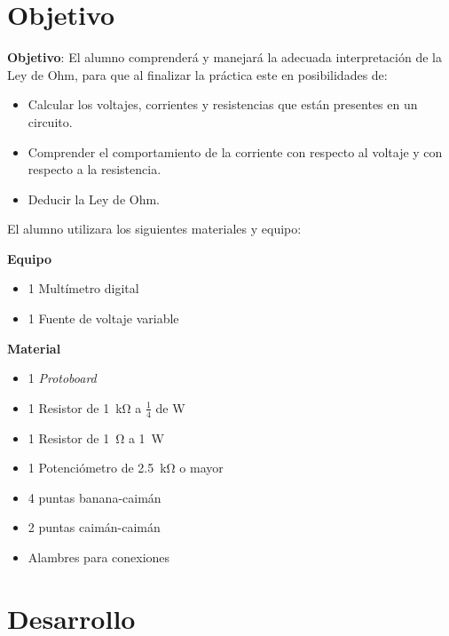 \documentclass[a4paper,12pt]{article}
\begin{document}
\newpage


\section*{Objetivo}

\textbf{Objetivo}: El alumno comprenderá y manejará la adecuada interpretación de la Ley de Ohm, para que al finalizar la práctica este en posibilidades de:\par

\begin{itemize}
	\item Calcular los voltajes, corrientes y resistencias que están presentes en un circuito.
	\item Comprender el comportamiento de la corriente con respecto al voltaje y con respecto a la resistencia.
	\item Deducir la Ley de Ohm.
\end{itemize}


El alumno utilizara los siguientes materiales y equipo:

\begin{multicols}{2}
\textbf{Equipo}\\
\begin{itemize}[nosep]
	\item 1 Multímetro digital
	\item 1 Fuente de voltaje variable
\end{itemize}

\columnbreak

\textbf{Material}\\
\begin{itemize}[nosep]
	\item 1 \textit{Protoboard}
	\item 1 Resistor de \SI{1}{\kohm} a $\frac{1}{4}$ de \si{\watt}
	\item 1 Resistor de \SI{1}{\ohm} a \SI{1}{\W}
	\item 1 Potenciómetro de \SI{2.5}{\kohm} o mayor
	\item 4 puntas banana-caimán
	\item 2 puntas caimán-caimán
	\item Alambres para conexiones
\end{itemize}

\end{multicols}

\section{Desarrollo}
\end{document}
